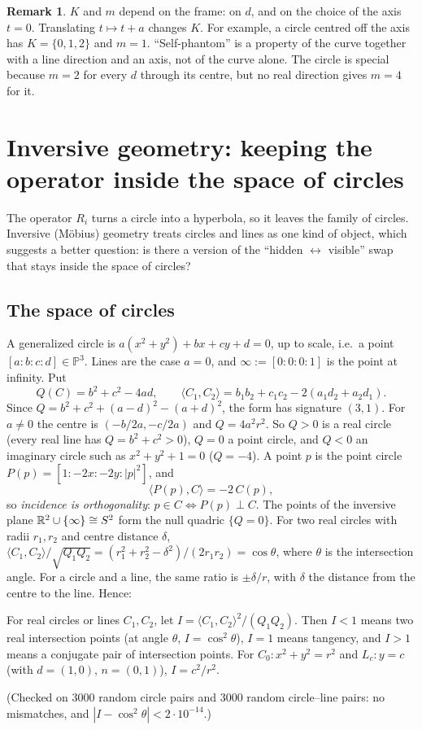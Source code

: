 \documentclass[11pt]{article}
\theoremstyle{definition}\newtheorem{definition}[theorem]{Definition}\newtheorem{remark}[theorem]{Remark}
\begin{document}
\begin{remark}
$K$ and $m$ depend on the frame: on $d$, and on the choice of the axis $t=0$. Translating $t\mapsto t+a$ changes $K$. For example, a circle centred off the axis has $K=\{0,1,2\}$ and $m=1$. ``Self-phantom'' is a property of the curve together with a line direction and an axis, not of the curve alone. The circle is special because $m=2$ for every $d$ through its centre, but no real direction gives $m=4$ for it.
\end{remark}

\section{Inversive geometry: keeping the operator inside the space of circles}\label{sec:inv}
The operator $R_i$ turns a circle into a hyperbola, so it leaves the family of circles. Inversive (Möbius) geometry treats circles and lines as one kind of object, which suggests a better question: is there a version of the ``hidden $\leftrightarrow$ visible'' swap that stays inside the space of circles?

\subsection{The space of circles}
A generalized circle is $a(x^2+y^2)+bx+cy+d=0$, up to scale, i.e.\ a point $[a:b:c:d]\in\mathbb{P}^3$. Lines are the case $a=0$, and $\infty:=[0:0:0:1]$ is the point at infinity. Put
\[ Q(C)=b^2+c^2-4ad,\qquad \langle C_1,C_2\rangle=b_1b_2+c_1c_2-2(a_1d_2+a_2d_1). \]
Since $Q=b^2+c^2+(a-d)^2-(a+d)^2$, the form has signature $(3,1)$. For $a\neq0$ the centre is $(-b/2a,-c/2a)$ and $Q=4a^2r^2$. So $Q>0$ is a real circle (every real line has $Q=b^2+c^2>0$), $Q=0$ a point circle, and $Q<0$ an imaginary circle such as $x^2+y^2+1=0$ ($Q=-4$). A point $p$ is the point circle $P(p)=[1:-2x:-2y:|p|^2]$, and
\[ \langle P(p),C\rangle=-2\,C(p), \]
so \emph{incidence is orthogonality}: $p\in C\iff P(p)\perp C$. The points of the inversive plane $\mathbb{R}^2\cup\{\infty\}\cong S^2$ form the null quadric $\{Q=0\}$. For two real circles with radii $r_1,r_2$ and centre distance $\delta$, $\langle C_1,C_2\rangle/\sqrt{Q_1Q_2}=(r_1^2+r_2^2-\delta^2)/(2r_1r_2)=\cos\theta$, where $\theta$ is the intersection angle. For a circle and a line, the same ratio is $\pm\delta/r$, with $\delta$ the distance from the centre to the line. Hence:

\begin{proposition}\label{prop:inv}
For real circles or lines $C_1,C_2$, let $I=\langle C_1,C_2\rangle^2/(Q_1Q_2)$. Then $I<1$ means two real intersection points (at angle $\theta$, $I=\cos^2\theta$), $I=1$ means tangency, and $I>1$ means a conjugate pair of intersection points. For $C_0:x^2+y^2=r^2$ and $L_c:y=c$ (with $d=(1,0)$, $n=(0,1)$), $I=c^2/r^2$.
\end{proposition}
\noindent(Checked on 3000 random circle pairs and 3000 random circle–line pairs: no mismatches, and $|I-\cos^2\theta|<2\cdot10^{-14}$.)
\end{document}

